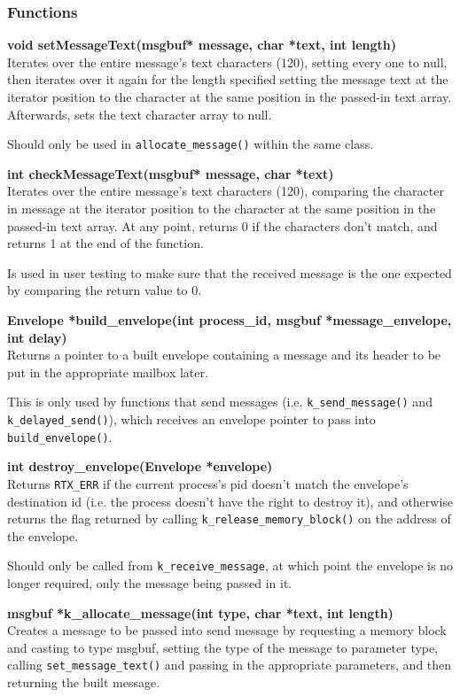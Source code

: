 \documentclass[11pt, oneside]{article}
\begin{document}
\subsubsection{Functions}
{\bf void setMessageText(msgbuf* message, char *text, int length)}\\
Iterates over the entire message's text characters (120), setting every one to null, then iterates over it again for the length specified setting the message text at the iterator position to the character at the same position in the passed-in text array. Afterwards, sets the text character array to null.

Should only be used in {\tt allocate\_message()} within the same class.

{\bf int checkMessageText(msgbuf* message, char *text)}\\
Iterates over the entire message's text characters (120), comparing the character in message at the iterator position to the character at the same position in the passed-in text array. At any point, returns 0 if the characters don't match, and returns 1 at the end of the function.

Is used in user testing to make sure that the received message is the one expected by comparing the return value to 0.

{\bf Envelope *build\_envelope(int process\_id, msgbuf *message\_envelope, int delay)}\\
Returns a pointer to a built envelope containing a message and its header to be put in the appropriate mailbox later.

This is only used by functions that send messages (i.e. {\tt k\_send\_message()} and {\tt k\_delayed\_send()}), which receives an envelope pointer to pass into {\tt build\_envelope()}.

{\bf int destroy\_envelope(Envelope *envelope)}\\
Returns {\tt RTX\_ERR} if the current process's pid doesn't match the envelope's destination id (i.e. the process doesn't have the right to destroy it), and otherwise returns the flag returned by calling {\tt k\_release\_memory\_block()} on the address of the envelope.

Should only be called from {\tt k\_receive\_message}, at which point the envelope is no longer required, only the message being passed in it.

{\bf msgbuf *k\_allocate\_message(int type, char *text, int length)}\\
Creates a message to be passed into send message by requesting a memory block and casting to type msgbuf, setting the type of the message to parameter type, calling {\tt set\_message\_text()} and passing in the appropriate parameters, and then returning the built message.
\end{document}
